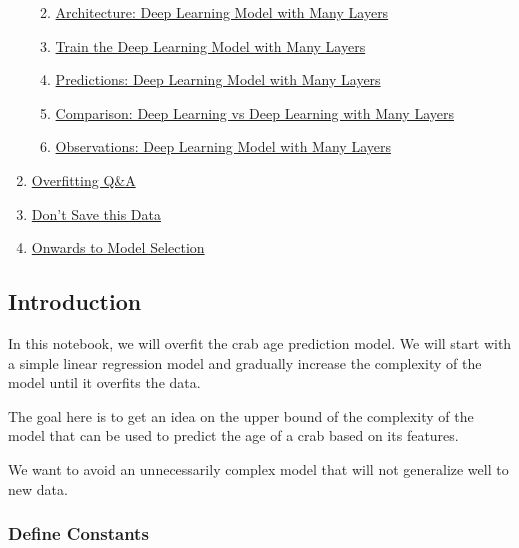 \documentclass[11pt]{article}
\providecommand{\tightlist}{%
      \setlength{\itemsep}{0pt}\setlength{\parskip}{0pt}}
\begin{document}
\begin{enumerate}
  \begin{enumerate}
  \def\labelenumii{\arabic{enumii}.}
  \tightlist
  \item
    \hyperref[architecture-deep-learning-model-with-many-layers]{Architecture: Deep Learning Model with Many Layers}
  \item
    \hyperref[train-the-deep-learning-model-with-many-layers]{Train the Deep Learning Model with Many Layers}
  \item
    \hyperref[predictions-deep-learning-model-with-many-layers]{Predictions: Deep Learning Model with Many Layers}
  \item
    \hyperref[comparison-deep-learning-vs-deep-learning-with-many-layers]{Comparison: Deep Learning vs Deep Learning with Many Layers}
  \item
    \hyperref[observations-deep-learning-model-with-many-layers]{Observations: Deep Learning Model with Many Layers}
  \end{enumerate}
\item
  \hyperref[overfitting-qa]{Overfitting Q&A}
\item
  \hyperref[dont-save-this-data]{Don’t Save this Data}
\item
  \hyperref[onwards-to-model-selection]{Onwards to Model Selection}
\end{enumerate}

    \subsection{Introduction}\label{introduction}

In this notebook, we will overfit the crab age prediction model. We will
start with a simple linear regression model and gradually increase the
complexity of the model until it overfits the data.

The goal here is to get an idea on the upper bound of the complexity of
the model that can be used to predict the age of a crab based on its
features.

We want to avoid an unnecessarily complex model that will not generalize
well to new data.

\subsubsection{Define Constants}\label{define-constants}
\end{document}
